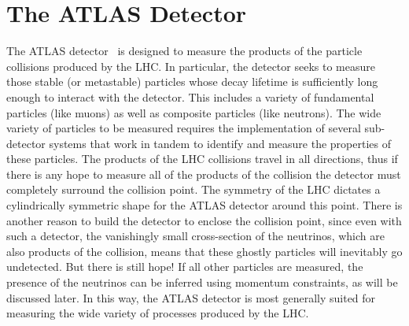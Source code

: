 \chapter{The ATLAS Detector}
\label{sec:atlas}



The ATLAS detector~\cite{ATLAS} is designed to measure
the products of the particle collisions produced by the LHC.
In particular, the detector seeks to measure those stable 
(or metastable) particles whose decay lifetime is sufficiently
long enough to interact with the detector.  This includes
a variety of fundamental particles (like muons) as well as 
composite particles (like neutrons). The wide variety of 
particles to be measured requires the implementation
of several sub-detector systems that work in tandem 
to identify and measure the properties of these particles.
The products of the LHC collisions travel in all directions, 
thus if there is any hope to measure all of the products of the collision
the detector must completely surround the collision point. 
The symmetry of the LHC dictates a cylindrically symmetric
shape for the ATLAS detector around this point.
There is another reason to build the detector to enclose
the collision point, since 
even with such a detector, the vanishingly small
cross-section of the neutrinos, which are also products
of the collision, means that these ghostly particles
will inevitably go undetected. But there is still hope!
If all other particles are measured, 
the presence of the neutrinos can be inferred 
using momentum constraints, as will be discussed later.  
In this way, the ATLAS detector is most generally suited
for measuring the wide variety of processes produced
by the LHC. 

